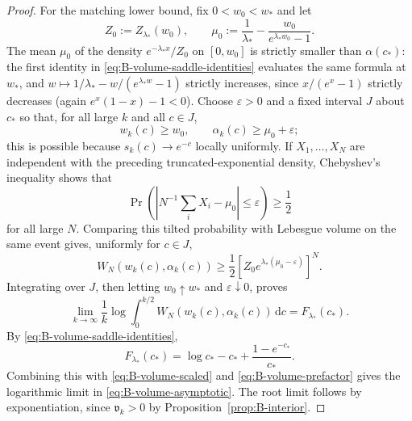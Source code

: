 \documentclass[10pt,a4paper]{amsart}
\begin{document}
\begin{proof}
For the matching lower bound, fix $0<w_0<w_*$ and let
\[
 Z_0:=Z_{\lambda_*}(w_0),\qquad
 \mu_0:=\frac1{\lambda_*}
        -\frac{w_0}{e^{\lambda_*w_0}-1}.
\]
The mean $\mu_0$ of the density
$e^{-\lambda_*x}/Z_0$ on $[0,w_0]$ is strictly smaller than
$\alpha(c_*)$: the first identity in
\eqref{eq:B-volume-saddle-identities} evaluates the same formula at
$w_*$, and $w\mapsto1/\lambda_*-w/(e^{\lambda_*w}-1)$ strictly
increases, since $x/(e^x-1)$ strictly decreases (again
$e^x(1-x)-1<0$).  Choose
$\varepsilon>0$ and a fixed interval $J$ about $c_*$ so that, for all
large $k$ and all $c\in J$,
\[
 w_k(c)\ge w_0,\qquad \alpha_k(c)\ge\mu_0+\varepsilon;
\]
this is possible because $s_k(c)\to e^{-c}$ locally uniformly.  If
$X_1,\ldots,X_N$ are independent with the preceding truncated-exponential
density, Chebyshev's inequality shows that
\[
 \Pr\left(\left|N^{-1}\sum_iX_i-\mu_0\right|\le\varepsilon\right)
 \ge\frac12
\]
for all large $N$.  Comparing this tilted probability with Lebesgue volume
on the same event gives, uniformly for $c\in J$,
\[
 W_N(w_k(c),\alpha_k(c))
 \ge\frac12\left[Z_0e^{\lambda_*(\mu_0-\varepsilon)}\right]^N.
\]
Integrating over $J$, then letting $w_0\uparrow w_*$ and
$\varepsilon\downarrow0$, proves
\[
 \lim_{k\to\infty}\frac1k\log
 \int_0^{k/2}W_N(w_k(c),\alpha_k(c))\,\mathrm d c
 =F_{\lambda_*}(c_*).
\]
By \eqref{eq:B-volume-saddle-identities},
\[
 F_{\lambda_*}(c_*)
 =\log c_*-c_*+\frac{1-e^{-c_*}}{c_*}.
\]
Combining this with \eqref{eq:B-volume-scaled} and
\eqref{eq:B-volume-prefactor} gives the logarithmic limit in
\eqref{eq:B-volume-asymptotic}.  The root limit follows by exponentiation,
since $\mathfrak v_k>0$ by Proposition~\ref{prop:B-interior}.
\end{proof}
\end{document}
